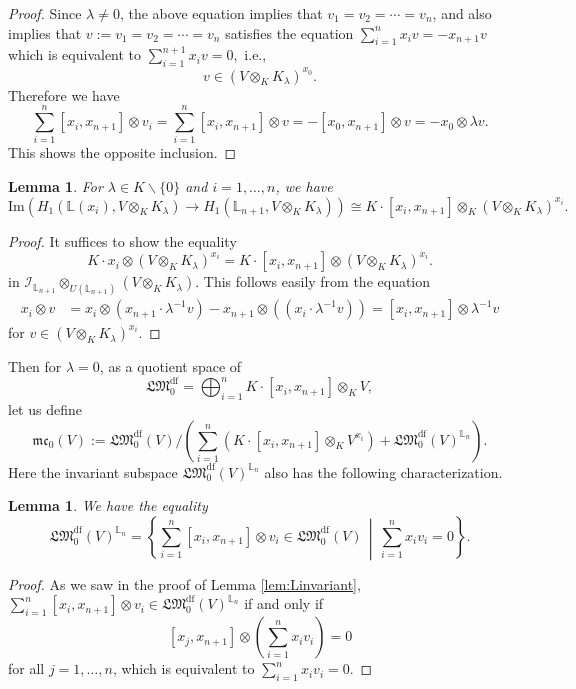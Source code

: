 \documentclass[a4paper,12pt]{article}
\newtheorem{lem}[thm]{Lemma}
\theoremstyle{definition}
\theoremstyle{remark}
\begin{document}
\begin{proof}
Since $\lambda\neq 0$, 
the above equation implies that $v_1=v_2=\cdots=v_n$, and
also implies that   
$v:=v_1=v_2=\cdots=v_n$ satisfies the equation $\sum_{i=1}^{n}x_{i}v=-x_{n+1}v$
which is equivalent to
\(
	\sum_{i=1}^{n+1} x_{i}v=0,
\)
i.e., 
\[
	v\in (V\otimes_{K}K_{\lambda})^{x_{0}}.
\]
Therefore we have
\[
	\sum_{i=1}^{n} [x_i, x_{n+1}]\otimes v_i
	=\sum_{i=1}^{n} [x_i, x_{n+1}]\otimes v
	=-[x_{0}, x_{n+1}]\otimes v
	=-x_{0}\otimes \lambda v.
\]
This shows the opposite inclusion.
\end{proof}
\begin{lem}\label{lem:K}
For $\lambda\in K\backslash\{0\}$ and $i=1,\ldots,n$, we have
\[
	\mathrm{Im}\left(
		H_1(\mathbb{L}(x_{i}), V\otimes_{K} K_{\lambda})\to H_1(\mathbb{L}_{n+1}, V\otimes_{K} K_{\lambda})
	\right)
	\cong K\cdot [x_{i},x_{n+1}]\otimes_{K} (V\otimes_{K} K_{\lambda})^{x_{i}}.
\]
\end{lem}
\begin{proof}
It suffices to show the equality 
\[
	K\cdot x_{i}\otimes (V\otimes_{K} K_{\lambda})^{x_{i}}=K\cdot [x_{i},x_{n+1}]\otimes (V\otimes_{K} K_{\lambda})^{x_{i}}.
\]
in $\mathcal{I}_{\mathbb{L}_{n+1}}\otimes_{U(\mathbb{L}_{n+1})}(V\otimes_{K} K_{\lambda})$.
This follows  easily from the equation
\begin{align*}
x_{i}\otimes v&=x_{i}\otimes (x_{n+1}\cdot \lambda^{-1}v)-x_{n+1}\otimes ((x_{i}\cdot \lambda^{-1}v))=
[x_{i},x_{n+1}]\otimes \lambda^{-1}v
\end{align*}
for $v\in (V\otimes_{K} K_{\lambda})^{x_{i}}$.
\end{proof}

Then for $\lambda=0$,
as a quotient space of 
\[
	\mathfrak{LM}_{0}^{\mathrm{df}}= 
	\bigoplus_{i=1}^{n} K\cdot [x_{i},x_{n+1}]\otimes_{K} V,
\]
let us define  
\[
	\mathfrak{mc}_{0}(V):=\mathfrak{LM}^{\mathrm{df}}_{0}(V)/
	\left(\sum_{i=1}^{n} \left(K\cdot [x_{i},x_{n+1}]\otimes_{K} V^{x_{i}}
	\right)+\mathfrak{LM}^{\mathrm{df}}_{0}(V)^{\mathbb{L}_{n}}\right).
\]
Here the invariant subspace $\mathfrak{LM}^{\mathrm{df}}_{0}(V)^{\mathbb{L}_{n}}$
also has the following characterization.
\begin{lem}\label{lem:Linvariant2}
We have the equality
\[
	\mathfrak{LM}^{\mathrm{df}}_{0}(V)^{\mathbb{L}_{n}}
	=
	\left\{
		\sum_{i=1}^{n} [x_{i},x_{n+1}]\otimes v_i\in \mathfrak{LM}^{\mathrm{df}}_{0}(V)\,\middle|\,
		\sum_{i=1}^{n} x_{i}v_i=0
	\right\}.
\]
\end{lem}
\begin{proof}
As we saw in the proof of Lemma \ref{lem:Linvariant}, 
$\sum_{i=1}^{n} [x_{i},x_{n+1}]\otimes v_i\in \mathfrak{LM}^{\mathrm{df}}_{0}(V)^{\mathbb{L}_{n}}$
if and only if 
\[
	[x_{j},x_{n+1}]\otimes \left(\sum_{i=1}^{n} x_{i}v_i\right)=0
\]
for all $j=1,\ldots,n$, which is equivalent to $\sum_{i=1}^{n} x_{i}v_i=0$.
\end{proof}
\end{document}
